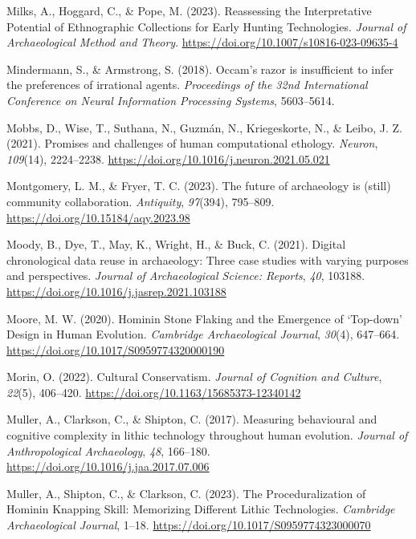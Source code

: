 \documentclass[
  11pt,
  letterpaper,
  DIV=11,
  numbers=noendperiod]{scrartcl}
\newlength{\cslhangindent}
\newenvironment{CSLReferences}[2] %
 {\begin{list}{}{%
  \setlength{\itemindent}{0pt}
  \setlength{\leftmargin}{0pt}
  \setlength{\parsep}{0pt}
  \ifodd #1
   \setlength{\leftmargin}{\cslhangindent}
   \setlength{\itemindent}{-1\cslhangindent}
  \fi
  \setlength{\itemsep}{#2\baselineskip}}}
 {\end{list}}
\begin{document}
\begin{CSLReferences}{1}{0}
Milks, A., Hoggard, C., \& Pope, M. (2023). Reassessing the
Interpretative Potential of Ethnographic Collections for Early Hunting
Technologies. \emph{Journal of Archaeological Method and Theory}.
\url{https://doi.org/10.1007/s10816-023-09635-4}

Mindermann, S., \& Armstrong, S. (2018). Occam's razor is insufficient
to infer the preferences of irrational agents. \emph{Proceedings of the
32nd {International} {Conference} on {Neural} {Information} {Processing}
{Systems}}, 5603--5614.

Mobbs, D., Wise, T., Suthana, N., Guzmán, N., Kriegeskorte, N., \&
Leibo, J. Z. (2021). Promises and challenges of human computational
ethology. \emph{Neuron}, \emph{109}(14), 2224--2238.
\url{https://doi.org/10.1016/j.neuron.2021.05.021}

Montgomery, L. M., \& Fryer, T. C. (2023). The future of archaeology is
(still) community collaboration. \emph{Antiquity}, \emph{97}(394),
795--809. \url{https://doi.org/10.15184/aqy.2023.98}

Moody, B., Dye, T., May, K., Wright, H., \& Buck, C. (2021). Digital
chronological data reuse in archaeology: Three case studies with varying
purposes and perspectives. \emph{Journal of Archaeological Science:
Reports}, \emph{40}, 103188.
\url{https://doi.org/10.1016/j.jasrep.2021.103188}

Moore, M. W. (2020). Hominin Stone Flaking and the Emergence of
{`}Top-down{'} Design in Human Evolution. \emph{Cambridge Archaeological
Journal}, \emph{30}(4), 647--664.
\url{https://doi.org/10.1017/S0959774320000190}

Morin, O. (2022). Cultural Conservatism. \emph{Journal of Cognition and
Culture}, \emph{22}(5), 406--420.
\url{https://doi.org/10.1163/15685373-12340142}

Muller, A., Clarkson, C., \& Shipton, C. (2017). Measuring behavioural
and cognitive complexity in lithic technology throughout human
evolution. \emph{Journal of Anthropological Archaeology}, \emph{48},
166--180. \url{https://doi.org/10.1016/j.jaa.2017.07.006}

Muller, A., Shipton, C., \& Clarkson, C. (2023). The Proceduralization
of Hominin Knapping Skill: Memorizing Different Lithic Technologies.
\emph{Cambridge Archaeological Journal}, 1--18.
\url{https://doi.org/10.1017/S0959774323000070}


\end{CSLReferences}
\end{document}
